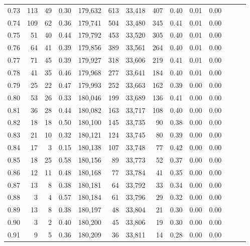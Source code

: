 \begin{tabular}{rrrrrrrrrrrrrr}
0.73 &    113 &     49 &  0.30 &  179,632 &      613 &  33,418 &     407 &  0.40 &  0.01 &      0.00 \\
0.74 &    109 &     62 &  0.36 &  179,741 &      504 &  33,480 &     345 &  0.41 &  0.01 &      0.00 \\
0.75 &     51 &     40 &  0.44 &  179,792 &      453 &  33,520 &     305 &  0.40 &  0.01 &      0.00 \\
0.76 &     64 &     41 &  0.39 &  179,856 &      389 &  33,561 &     264 &  0.40 &  0.01 &      0.00 \\
0.77 &     71 &     45 &  0.39 &  179,927 &      318 &  33,606 &     219 &  0.41 &  0.01 &      0.00 \\
0.78 &     41 &     35 &  0.46 &  179,968 &      277 &  33,641 &     184 &  0.40 &  0.01 &      0.00 \\
0.79 &     25 &     22 &  0.47 &  179,993 &      252 &  33,663 &     162 &  0.39 &  0.00 &      0.00 \\
0.80 &     53 &     26 &  0.33 &  180,046 &      199 &  33,689 &     136 &  0.41 &  0.00 &      0.00 \\
0.81 &     36 &     28 &  0.44 &  180,082 &      163 &  33,717 &     108 &  0.40 &  0.00 &      0.00 \\
0.82 &     18 &     18 &  0.50 &  180,100 &      145 &  33,735 &      90 &  0.38 &  0.00 &      0.00 \\
0.83 &     21 &     10 &  0.32 &  180,121 &      124 &  33,745 &      80 &  0.39 &  0.00 &      0.00 \\
0.84 &     17 &      3 &  0.15 &  180,138 &      107 &  33,748 &      77 &  0.42 &  0.00 &      0.00 \\
0.85 &     18 &     25 &  0.58 &  180,156 &       89 &  33,773 &      52 &  0.37 &  0.00 &      0.00 \\
0.86 &     12 &     11 &  0.48 &  180,168 &       77 &  33,784 &      41 &  0.35 &  0.00 &      0.00 \\
0.87 &     13 &      8 &  0.38 &  180,181 &       64 &  33,792 &      33 &  0.34 &  0.00 &      0.00 \\
0.88 &      3 &      4 &  0.57 &  180,184 &       61 &  33,796 &      29 &  0.32 &  0.00 &      0.00 \\
0.89 &     13 &      8 &  0.38 &  180,197 &       48 &  33,804 &      21 &  0.30 &  0.00 &      0.00 \\
0.90 &      3 &      2 &  0.40 &  180,200 &       45 &  33,806 &      19 &  0.30 &  0.00 &      0.00 \\
0.91 &      9 &      5 &  0.36 &  180,209 &       36 &  33,811 &      14 &  0.28 &  0.00 &      0.00 \\

\end{tabular}
